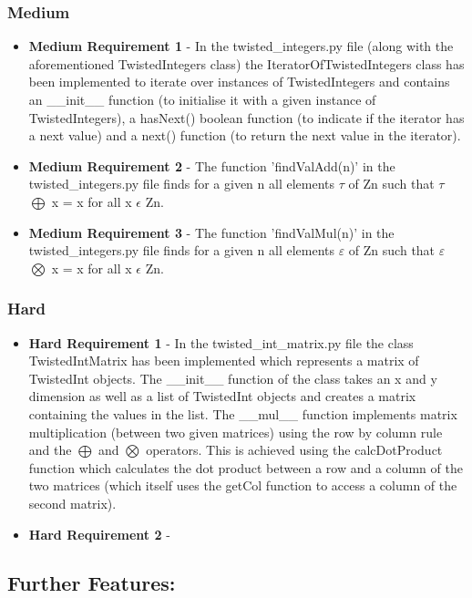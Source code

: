 \documentclass[11]{article}
\begin{document}
		\subsubsection{Medium}
			\begin{itemize}
				\item \textbf{Medium Requirement 1} - In the twisted\_integers.py file (along with the aforementioned TwistedIntegers class) the IteratorOfTwistedIntegers class has been implemented to iterate over instances of TwistedIntegers and contains an \_\_init\_\_ function (to initialise it with a given instance of TwistedIntegers), a hasNext() boolean function (to indicate if the iterator has a next value) and a next() function (to return the next value in the iterator).
				\item \textbf{Medium Requirement 2} - The function 'findValAdd(n)' in the twisted\_integers.py file finds for a given n all elements $\tau$ of Zn such that $\tau$ $\bigoplus$ x = x for all x $\epsilon$ Zn.
				\item \textbf{Medium Requirement 3} - The function 'findValMul(n)' in the twisted\_integers.py file finds for a given n all elements $\varepsilon$ of Zn such that $\varepsilon$ $\bigotimes$ x = x for all x $\epsilon$ Zn.
			\end{itemize}
		\subsubsection{Hard}
				\begin{itemize}
					\item \textbf{Hard Requirement 1} - In the twisted\_int\_matrix.py file the class TwistedIntMatrix has been implemented which represents a matrix of TwistedInt objects. The \_\_init\_\_ function of the class takes an x and y dimension as well as a list of TwistedInt objects and creates a matrix containing the values in the list. The \_\_mul\_\_ function implements matrix multiplication (between two given matrices) using the row by column rule and the $\bigoplus$ and $\bigotimes$ operators. This is achieved using the calcDotProduct function which calculates the dot product between a row and a column of the two matrices (which itself uses the getCol function to access a column of the second matrix).
					\item \textbf{Hard Requirement 2} - 
				\end{itemize}
	\subsection{Further Features:}
\end{document}
